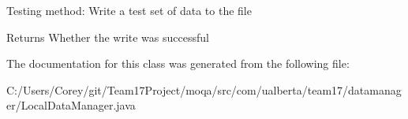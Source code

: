 Testing method\+: Write a test set of data to the file \begin{DoxyReturn}{Returns}
Whether the write was successful 
\end{DoxyReturn}


The documentation for this class was generated from the following file\+:\begin{DoxyCompactItemize}
\item 
C\+:/\+Users/\+Corey/git/\+Team17\+Project/moqa/src/com/ualberta/team17/datamanager/Local\+Data\+Manager.\+java\end{DoxyCompactItemize}
